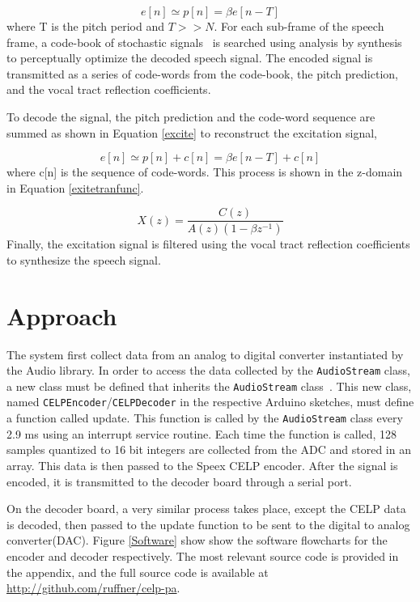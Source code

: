 \documentclass[letterpaper]{article}
\begin{document}
\begin{equation}\label{pitchpred}
    e[n] \simeq p[n] = \beta e[n-T]
\end{equation}
where T is the pitch period and $T >> N$. For each sub-frame of the speech frame, a code-book of stochastic signals~\cite{KimY.E2001Ecdf} is searched using analysis by synthesis to perceptually optimize the decoded speech signal. The encoded signal is transmitted as a series of code-words from the code-book, the pitch prediction, and the vocal tract reflection coefficients.

To decode the signal, the pitch prediction and the code-word sequence are summed as shown in Equation \ref{excite} to reconstruct the excitation signal,

\begin{equation}\label{excite}
    e[n] \simeq p[n] + c[n] = \beta e[n-T] +c[n]
\end{equation}
where c[n] is the sequence of code-words. This process is shown in the z-domain in Equation \ref{exitetranfunc}.

\begin{equation}\label{exitetranfunc}
    X(z) = \frac{C(z)}{A(z)(1-\beta z^{-1})}
\end{equation}
Finally, the excitation signal is filtered using the vocal tract reflection coefficients to synthesize the speech signal.

\section{Approach}

The system first collect data from an analog to digital converter instantiated by the Audio library. In order to access the data collected by the \texttt{AudioStream} class, a new class must be defined that inherits the \texttt{AudioStream} class~\cite{audio}. This new class, named \texttt{CELPEncoder}/\texttt{CELPDecoder} in the respective Arduino sketches, must define a function called update. This function is called by the \texttt{AudioStream} class every 2.9 ms using an interrupt service routine. Each time the function is called, 128 samples quantized to 16 bit integers are collected from the ADC and stored in an array. This data is then passed to the Speex CELP encoder. After the signal is encoded, it is transmitted to the decoder board through a serial port.

On the decoder board, a very similar process takes place, except the CELP data is decoded, then passed to the update function to be  sent to the digital to analog converter(DAC). Figure \ref{Software} show show the software flowcharts for the encoder and decoder respectively. The most relevant source code is provided in the appendix, and the full source code is available at \url{http://github.com/ruffner/celp-pa}.
\end{document}
